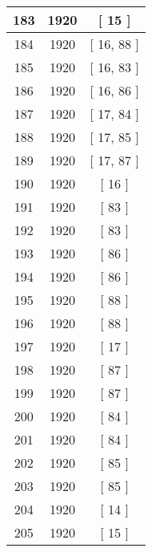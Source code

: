 \begin{center}
\begin{longtable}[H]{|| c c c ||}
\hline
183 & 1920 & [ 15 ] \\ 
\hline
184 & 1920 & [ 16, 88 ] \\ 
\hline
185 & 1920 & [ 16, 83 ] \\ 
\hline
186 & 1920 & [ 16, 86 ] \\ 
\hline
187 & 1920 & [ 17, 84 ] \\ 
\hline
188 & 1920 & [ 17, 85 ] \\ 
\hline
189 & 1920 & [ 17, 87 ] \\ 
\hline
190 & 1920 & [ 16 ] \\ 
\hline
191 & 1920 & [ 83 ] \\ 
\hline
192 & 1920 & [ 83 ] \\ 
\hline
193 & 1920 & [ 86 ] \\ 
\hline
194 & 1920 & [ 86 ] \\ 
\hline
195 & 1920 & [ 88 ] \\ 
\hline
196 & 1920 & [ 88 ] \\ 
\hline
197 & 1920 & [ 17 ] \\ 
\hline
198 & 1920 & [ 87 ] \\ 
\hline
199 & 1920 & [ 87 ] \\ 
\hline
200 & 1920 & [ 84 ] \\ 
\hline
201 & 1920 & [ 84 ] \\ 
\hline
202 & 1920 & [ 85 ] \\ 
\hline
203 & 1920 & [ 85 ] \\ 
\hline
204 & 1920 & [ 14 ] \\ 
\hline
205 & 1920 & [ 15 ] \\ 
\hline
\end{longtable}
\end{center}
